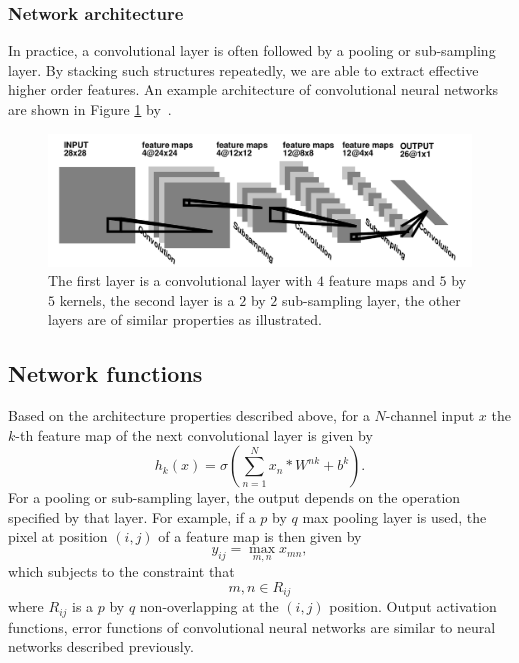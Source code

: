 \subsubsection{Network architecture}
\label{sec:Network architecture}
In practice, a convolutional layer is often followed by a pooling or sub-sampling layer. By stacking such structures repeatedly, we are able to extract effective higher order features. An example architecture of convolutional neural networks are shown in Figure \ref{cnnfig} by~\cite{lecun1995convolutional}.

\begin{figure}[h!]
  \centering
  \label{cnnfig}
  \includegraphics[width=\textwidth]{pics/cnn.png}
  \caption{The first layer is a convolutional layer with $4$ feature maps and $5$ by $5$ kernels, the second layer is a $2$ by $2$ sub-sampling layer, the other layers are of similar properties as illustrated.}
\end{figure}

\subsection{Network functions}
\label{sec:CNN functions}
Based on the architecture properties described above, for a $N$-channel input $x$ the $k$-th feature map of the next convolutional layer is given by
\begin{equation}
	h_k(x) = \sigma(\sum\limits_{n=1}^Nx_n\ast W^{nk} + b^k).
\end{equation}
For a pooling or sub-sampling layer, the output depends on the operation specified by that layer. For example, if a $p$ by $q$ max pooling layer is used, the pixel at position $(i,j)$ of a feature map is then given by
\begin{equation}
	\label{submx}
	y_{ij} = \max\limits_{m,n}x_{mn},
\end{equation}
which subjects to the constraint that
\begin{equation}
	m,n\in R_{ij}
\end{equation}
where $R_{ij}$ is a $p$ by $q$ non-overlapping at the $(i,j)$ position.
Output activation functions, error functions of convolutional neural networks are similar to neural networks described previously.

